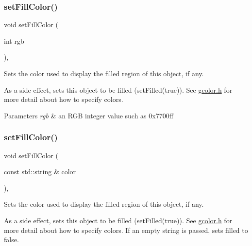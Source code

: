\subsubsection{\texorpdfstring{set\+Fill\+Color()}{setFillColor()}\hspace{0.1cm}{\footnotesize\ttfamily [2/3]}}
{\footnotesize\ttfamily void set\+Fill\+Color (\begin{DoxyParamCaption}\item[{int}]{rgb }\end{DoxyParamCaption})\hspace{0.3cm}{\ttfamily [virtual]}, {\ttfamily [inherited]}}



Sets the color used to display the filled region of this object, if any. 

As a side effect, sets this object to be filled (set\+Filled(true)). See \mbox{\hyperlink{gcolor_8h_source}{gcolor.\+h}} for more detail about how to specify colors.


\begin{DoxyParams}{Parameters}
{\em rgb} & an R\+GB integer value such as 0x7700ff \\
\hline
\end{DoxyParams}
\mbox{\label{classsgl_1_1GObject_adbc18b1a930aadd97d7437f9f7265b96}} 
\subsubsection{\texorpdfstring{set\+Fill\+Color()}{setFillColor()}\hspace{0.1cm}{\footnotesize\ttfamily [3/3]}}
{\footnotesize\ttfamily void set\+Fill\+Color (\begin{DoxyParamCaption}\item[{const std\+::string \&}]{color }\end{DoxyParamCaption})\hspace{0.3cm}{\ttfamily [virtual]}, {\ttfamily [inherited]}}



Sets the color used to display the filled region of this object, if any. 

As a side effect, sets this object to be filled (set\+Filled(true)). See \mbox{\hyperlink{gcolor_8h_source}{gcolor.\+h}} for more detail about how to specify colors. If an empty string is passed, sets filled to false.


